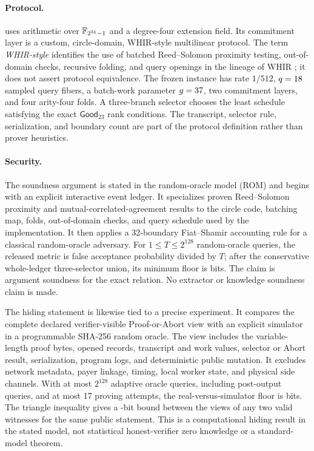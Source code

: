 \paragraph{Protocol.}
\Profile{} uses arithmetic over $\mathbb{F}_{2^{31}-1}$ and a degree-four extension field.
Its commitment layer is a custom, circle-domain, WHIR-style multilinear
protocol.  The term \emph{WHIR-style} identifies the use of batched
Reed--Solomon proximity testing, out-of-domain checks, recursive folding, and
query openings in the lineage of WHIR
\cite{ArnonChiesaFenziYogev2025WHIR}; it does not assert
protocol equivalence.  The frozen instance has rate $1/512$,
$q=18$ sampled query fibers, a batch-work parameter
$g=37$, two commitment layers, and four arity-four folds.  A
three-branch selector chooses the least schedule satisfying the exact
\(\mathsf{Good}_{23}\) rank conditions.  The transcript, selector rule,
serialization,
and boundary count are part of the protocol definition rather than prover
heuristics.

\paragraph{Security.}
The soundness argument is stated in the random-oracle model (ROM) and begins
with an explicit interactive event ledger.  It
specializes proven Reed--Solomon proximity and mutual-correlated-agreement
results to the circle code, batching map, folds, out-of-domain checks, and
query schedule used by the implementation.  It then applies a 32-boundary
Fiat--Shamir accounting rule for a classical random-oracle adversary.  For
$1\leq T\leq 2^{128}$ random-oracle queries, the released metric is false
acceptance probability divided by $T$; after the conservative whole-ledger
three-selector union, its minimum floor is \ProfileSoundnessBits{} bits.  The
claim is argument soundness for the exact relation.  No extractor or knowledge
soundness claim is made.

The hiding statement is likewise tied to a precise experiment.  It compares
the complete declared verifier-visible Proof-or-Abort view with an explicit
simulator in a programmable SHA-256 random oracle.  The view includes the
variable-length proof bytes, opened records, transcript and work values,
selector or Abort result, serialization, program logs, and deterministic
public mutation.  It excludes network metadata, payer linkage, timing, local
worker state, and physical side channels.  With at most $2^{128}$ adaptive
oracle queries, including post-output queries, and at most 17 proving
attempts, the real-versus-simulator floor is \ProfileSimulationBits{} bits.
The triangle inequality gives a \ProfilePairwiseBits-bit bound between the
views of any two valid witnesses for the same public statement.  This is a
computational hiding result in the stated model, not statistical honest-verifier
zero knowledge or a standard-model theorem.

